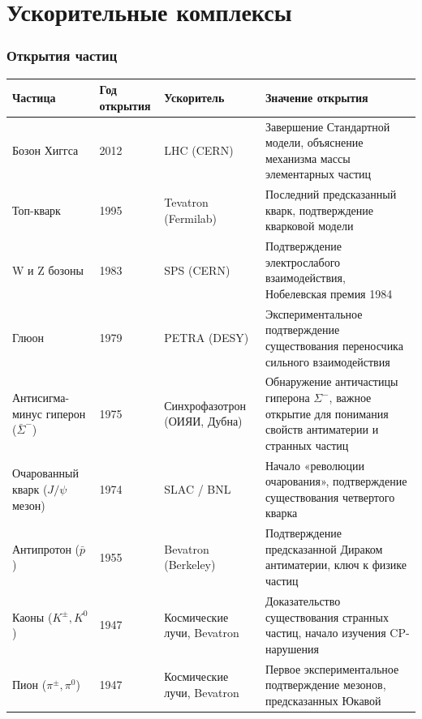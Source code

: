 \section{Ускорительные комплексы}

\begin{frame}
	
	\frametitle{Открытия частиц}
	\begin{table}[h!]
		\tiny
		\begin{longtable}{|p{3cm}|p{2cm}|p{3cm}|p{5cm}|}
			\hline
			\textbf{Частица} & \textbf{Год открытия} & \textbf{Ускоритель} & \textbf{Значение открытия} \\
			\hline
			
			\hline
			Бозон Хиггса & 2012 & LHC (CERN) & Завершение Стандартной модели, объяснение механизма массы элементарных частиц \\
			Топ-кварк & 1995 & Tevatron (Fermilab) & Последний предсказанный кварк, подтверждение кварковой модели \\
			W и Z бозоны & 1983 & SPS (CERN) & Подтверждение электрослабого взаимодействия, Нобелевская премия 1984 \\
			Глюон & 1979 & PETRA (DESY) & Экспериментальное подтверждение существования переносчика сильного взаимодействия \\
			Антисигма-минус гиперон ($\bar{\Sigma}^-$) & 1975 & Синхрофазотрон (ОИЯИ, Дубна) & Обнаружение античастицы гиперона \(\Sigma^-\), важное открытие для понимания свойств антиматерии и странных частиц \\
			Очарованный кварк ($J/\psi$ мезон) & 1974 & SLAC / BNL & Начало «революции очарования», подтверждение существования четвертого кварка \\
			Антипротон ($\bar{p}$) & 1955 & Bevatron (Berkeley) & Подтверждение предсказанной Дираком антиматерии, ключ к физике частиц \\
			Каоны ($K^\pm, K^0$) & 1947 & Космические лучи, Bevatron & Доказательство существования странных частиц, начало изучения CP-нарушения \\
			Пион ($\pi^\pm, \pi^0$) & 1947 & Космические лучи, Bevatron & Первое экспериментальное подтверждение мезонов, предсказанных Юкавой \\
			\hline
		\end{longtable}
	\end{table}
\end{frame}

